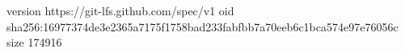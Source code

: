 version https://git-lfs.github.com/spec/v1
oid sha256:16977374de3e2365a7175f1758bad233fabfbb7a70eeb6c1bca574e97e76056c
size 174916
